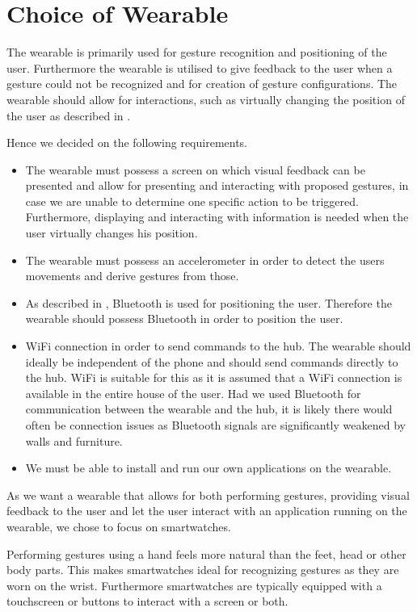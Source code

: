 \section{Choice of Wearable}
\label{sec:analysis:choice-of-wearables}

The wearable is primarily used for gesture recognition and positioning of the user. Furthermore the wearable is utilised to give feedback to the user when a gesture could not be recognized and for creation of gesture configurations. The wearable should allow for interactions, such as virtually changing the position of the user as described in .

Hence we decided on the following requirements.

\begin{itemize}
\item The wearable must possess a screen on which visual feedback can be presented and allow for presenting and interacting with proposed gestures, in case we are unable to determine one specific action to be triggered. Furthermore, displaying and interacting with information is needed when the user virtually changes his position.
\item The wearable must possess an accelerometer in order to detect the users movements and derive gestures from those.
\item As described in , Bluetooth is used for positioning the user. Therefore the wearable should possess Bluetooth in order to position the user.
\item WiFi connection in order to send commands to the hub. The wearable should ideally be independent of the phone and should send commands directly to the hub. WiFi is suitable for this as it is assumed that a WiFi connection is available in the entire house of the user. Had we used Bluetooth for communication between the wearable and the hub, it is likely there would often be connection issues as Bluetooth signals are significantly weakened by walls and furniture.
\item We must be able to install and run our own applications on the wearable.
\end{itemize}

As we want a wearable that allows for both performing gestures, providing visual feedback to the user and let the user interact with an application running on the wearable, we chose to focus on smartwatches.

Performing gestures using a hand feels more natural than the feet, head or other body parts. This makes smartwatches ideal for recognizing gestures as they are worn on the wrist. Furthermore smartwatches are typically equipped with a touchscreen or buttons to interact with a screen or both.

